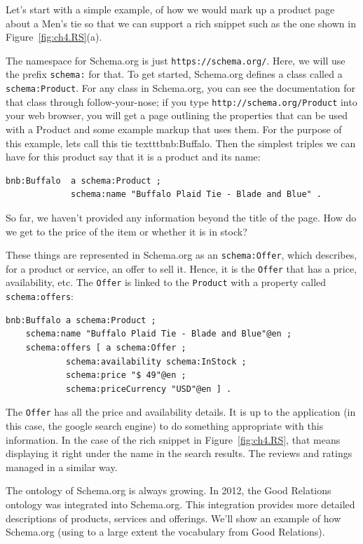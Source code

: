 Let's start with a simple example, of how we would mark up a product page about 
a Men's tie so that we can support a rich snippet such as the one shown in Figure~\ref{fig:ch4.RS}(a).

The namespace for Schema.org is just \texttt{https://schema.org/}. Here, we will 
use the prefix \texttt{schema:} for that. To get started, Schema.org defines a class called 
a \texttt{schema:Product}.  For any class in Schema.org, you can see the 
documentation for that class through follow-your-nose; if you type 
\texttt{http://schema.org/Product} into your web browser, you will get a page outlining
the properties that can be used with a Product and some example markup that uses them. 
For the purpose of this example, lets call this tie texttt{bnb:Buffalo}.  Then 
the simplest triples we can have for this product say that it is a product and its 
name:

\begin{lstlisting}
bnb:Buffalo  a schema:Product ;
             schema:name "Buffalo Plaid Tie - Blade and Blue" .
\end{lstlisting}

So far, we haven't provided any information beyond the title of the page.  How do we get
to the price of the item or whether it is in stock? 

These things are represented in Schema.org as an \texttt{schema:Offer}, which describes, 
for a product or service, an offer to sell it.  Hence, it is the \texttt{Offer} that has
a price, availability, etc.  The \texttt{Offer} is linked to the \texttt{Product} with a 
property called \texttt{schema:offers}:

\begin{lstlisting}
bnb:Buffalo a schema:Product ;
    schema:name "Buffalo Plaid Tie - Blade and Blue"@en ;
    schema:offers [ a schema:Offer ;
            schema:availability schema:InStock ;
            schema:price "$ 49"@en ;
            schema:priceCurrency "USD"@en ] .
\end{lstlisting}

The \texttt{Offer} has all the price and availability details.  It is up to the 
application (in this case, the google search engine) to do something appropriate
with this information.  In the case of the rich snippet in Figure~\ref{fig:ch4.RS}, that
means displaying it right under the name in the search results.  The reviews and ratings 
managed in a similar way. 

The ontology of Schema.org is always growing.  In 2012, the Good Relations ontology
was integrated into Schema.org.  This integration provides more detailed descriptions of 
products, services and offerings.  We'll show an example of how Schema.org 
(using to a large extent the vocabulary from Good Relations).

